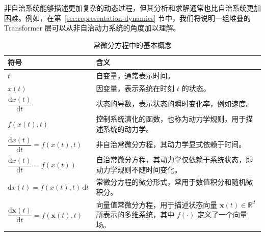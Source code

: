 \documentclass[UTF8,a4paper,zihao=-4,oneside,openany]{ctexbook}
\begin{document}
非自治系统能够描述更加复杂的动态过程，但其分析和求解通常也比自治系统更加困难。例如，在第~\ref{sec:representation-dynamics} 节中，我们将说明一组堆叠的 Transformer 层可以从非自治动力系统的角度加以理解。

\begin{table}[htbp]
    \centering
    \renewcommand{\arraystretch}{1.35}
    \setlength{\tabcolsep}{8pt}
    \begin{tabularx}{0.88\textwidth}{
        >{\raggedleft\arraybackslash}p{}
        |
        >{\raggedright\arraybackslash}X
    }
        \toprule
        \textbf{符号} & \textbf{含义} \\
        \midrule

        \(t\)
        &
        自变量，通常表示时间。
        \\

        \(x(t)\)
        &
        因变量，表示系统在时刻 \(t\) 的状态。
        \\

        \(\dfrac{\mathrm{d}x(t)}{\mathrm{d}t}\)
        &
        状态的导数，表示状态的瞬时变化率，例如速度。
        \\

        \(f(x(t),t)\)
        &
        控制系统演化的函数，也称为动力学规则，用于描述系统的动力学。
        \\

        \(\dfrac{\mathrm{d}x(t)}{\mathrm{d}t}
        =f(x(t),t)\)
        &
        非自治常微分方程，其动力学显式依赖于时间。
        \\

        \(\dfrac{\mathrm{d}x(t)}{\mathrm{d}t}
        =f(x(t))\)
        &
        自治常微分方程，其动力学仅依赖于系统状态，即动力学规则不随时间变化。
        \\

        \(\mathrm{d}x(t)
        =f(x(t),t)\,\mathrm{d}t\)
        &
        常微分方程的微分形式，常用于数值积分和随机微积分。
        \\

        \(\dfrac{\mathrm{d}\boldsymbol{x}(t)}{\mathrm{d}t}
        =f(\boldsymbol{x}(t),t)\)
        &
        向量值常微分方程，用于描述状态向量
        \(\boldsymbol{x}(t)\in\mathbb{R}^{d}\)
        所表示的多维系统，其中 \(f(\cdot)\) 定义了一个向量场。
        \\

        \bottomrule
    \end{tabularx}
    \caption{常微分方程中的基本概念}
    \label{tab:basic-ode-concepts}
\end{table}
\end{document}
